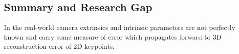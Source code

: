 \subsection{Summary and Research Gap}

In the real-world camera extrinsics and intrinsic parameters are not perfectly known and carry some measure of error which propagates forward to 3D reconstruction error of 2D keypoints.

